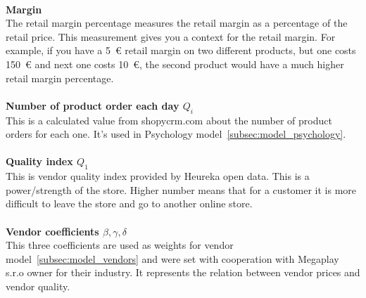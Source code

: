 \\
\textbf{Margin}\\
The retail margin percentage measures the retail margin as a percentage of the retail price.
This measurement gives you a context for the retail margin.
For example, if you have a 5~€ retail margin on two different products, but one costs 150~€ and next one costs 10~€, the second product would have a much higher retail margin percentage.\\
\\
\textbf{Number of product order each day $Q_i$}\\
This is a calculated value from shopycrm.com about the number of product orders for each one.
It's used in Psychology model~\ref{subsec:model_psychology}. \\
\\
\textbf{Quality index $Q_1$}\\
This is vendor quality index provided by Heureka open data.
This is a power/strength of the store.
Higher number means that for a customer it is more difficult to leave the store and go to another online store.\\
\\
\textbf{Vendor coefficients $\beta, \gamma, \delta$} \label{vendorCoeff}\\
This three coefficients are used as weights for vendor model~\ref{subsec:model_vendors} and were set with cooperation with Megaplay s.r.o owner for their industry.
It represents the relation between vendor prices and vendor quality.\\
\\
